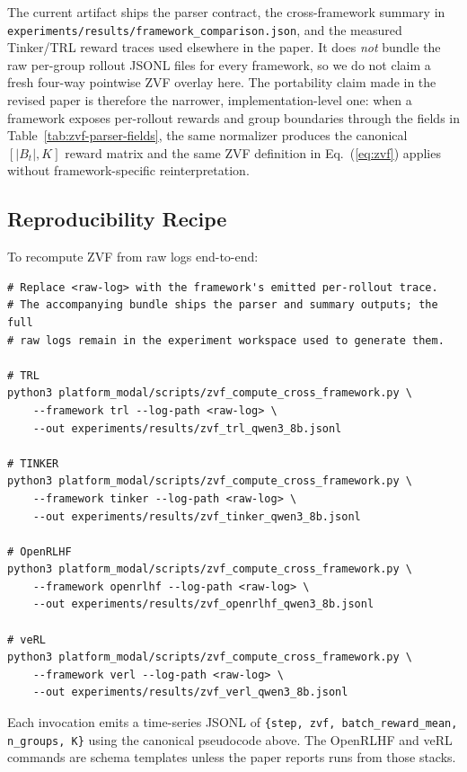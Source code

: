 The current \artifactstatusword{} artifact ships the parser contract, the
cross-framework summary in
\texttt{experiments/results/framework\_comparison.json}, and the measured
Tinker/TRL reward traces used elsewhere in the paper. It does
\emph{not} bundle the raw per-group rollout JSONL files for every framework,
so we do not claim a fresh four-way pointwise ZVF overlay here. The
portability claim made in the revised paper is therefore the narrower,
implementation-level one: when a framework exposes per-rollout rewards and
group boundaries through the fields in Table~\ref{tab:zvf-parser-fields},
the same normalizer produces the canonical $[|B_t|, K]$ reward matrix and
the same ZVF definition in Eq.~(\ref{eq:zvf}) applies without
framework-specific reinterpretation.

\subsection{Reproducibility Recipe}

To recompute ZVF from raw logs end-to-end:
\begin{verbatim}
# Replace <raw-log> with the framework's emitted per-rollout trace.
# The accompanying bundle ships the parser and summary outputs; the full
# raw logs remain in the experiment workspace used to generate them.

# TRL
python3 platform_modal/scripts/zvf_compute_cross_framework.py \
    --framework trl --log-path <raw-log> \
    --out experiments/results/zvf_trl_qwen3_8b.jsonl

# TINKER
python3 platform_modal/scripts/zvf_compute_cross_framework.py \
    --framework tinker --log-path <raw-log> \
    --out experiments/results/zvf_tinker_qwen3_8b.jsonl

# OpenRLHF
python3 platform_modal/scripts/zvf_compute_cross_framework.py \
    --framework openrlhf --log-path <raw-log> \
    --out experiments/results/zvf_openrlhf_qwen3_8b.jsonl

# veRL
python3 platform_modal/scripts/zvf_compute_cross_framework.py \
    --framework verl --log-path <raw-log> \
    --out experiments/results/zvf_verl_qwen3_8b.jsonl
\end{verbatim}
Each invocation emits a time-series JSONL of
\texttt{\{step, zvf, batch\_reward\_mean, n\_groups, K\}} using the
canonical pseudocode above. The OpenRLHF and veRL commands are schema
templates unless the paper reports runs from those stacks.
